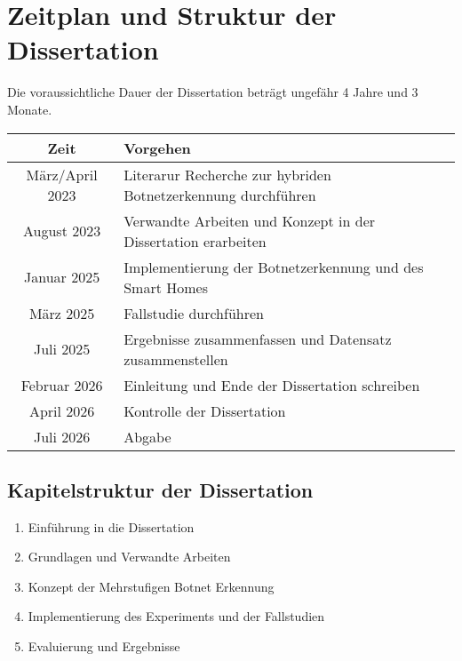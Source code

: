 \section{Zeitplan und Struktur der Dissertation}
\label{sec:plan}

Die voraussichtliche Dauer der Dissertation beträgt ungefähr 4 Jahre und 3 Monate.

\begin{center}
    \begin{tabular}[c]{| c | l |}
        \hline
        \rowcolor{lightgray} Zeit & Vorgehen \\ [0.5ex]
        \hline
        März/April 2023 & Literarur Recherche zur hybriden Botnetzerkennung durchführen \\
        \hline
        August 2023 & Verwandte Arbeiten und Konzept in der Dissertation erarbeiten \\
        \hline
        Januar 2025 & Implementierung der Botnetzerkennung und des Smart Homes \\
        \hline
        März 2025 & Fallstudie durchführen \\
        \hline
        Juli 2025 & Ergebnisse zusammenfassen und Datensatz zusammenstellen \\
        \hline
        Februar 2026 & Einleitung und Ende der Dissertation schreiben \\
        \hline
        April 2026 & Kontrolle der Dissertation \\
        \hline
        Juli 2026 & Abgabe \\
        \hline
    \end{tabular}
\end{center}

\subsection*{Kapitelstruktur der Dissertation}

\begin{enumerate}[label=\Roman*]
    \item Einführung in die Dissertation
    \item Grundlagen und Verwandte Arbeiten
    \item Konzept der Mehrstufigen Botnet Erkennung
    \item Implementierung des Experiments und der Fallstudien
    \item Evaluierung und Ergebnisse
\end{enumerate}

